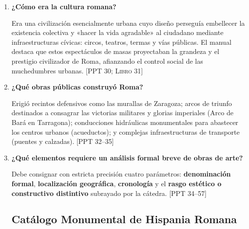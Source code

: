 \documentclass[11pt,letterpaper]{article}
\newcommand{\fuente}[1]{\nolinebreak\hfill{\footnotesize\color{black!55}\textsc{[#1]}}}
\newcommand{\preg}[1]{\item \textbf{#1}\par\nopagebreak\vspace{0.2em}}
\begin{document}
\begin{enumerate}[resume]
  \preg{¿Cómo era la cultura romana?}
  Era una civilización esencialmente urbana cuyo diseño perseguía embellecer la existencia colectiva y «hacer la vida agradable» al ciudadano mediante infraestructuras cívicas: circos, teatros, termas y vías públicas. El manual destaca que estos espectáculos de masas proyectaban la grandeza y el prestigio civilizador de Roma, afianzando el control social de las muchedumbres urbanas. \fuente{PPT 30; Libro 31}

  \preg{¿Qué obras públicas construyó Roma?}
  Erigió recintos defensivos como las murallas de Zaragoza; arcos de triunfo destinados a consagrar las victorias militares y glorias imperiales (Arco de Bará en Tarragona); conducciones hidráulicas monumentales para abastecer los centros urbanos (acueductos); y complejas infraestructuras de transporte (puentes y calzadas). \fuente{PPT 32--35}

  \preg{¿Qué elementos requiere un análisis formal breve de obras de arte?}
  Debe consignar con estricta precisión cuatro parámetros: \textbf{denominación formal}, \textbf{localización geográfica}, \textbf{cronología} y el \textbf{rasgo estético o constructivo distintivo} subrayado por la cátedra. \fuente{PPT 34--57}

  \subsection*{Catálogo Monumental de Hispania Romana}


\end{enumerate}
\end{document}
